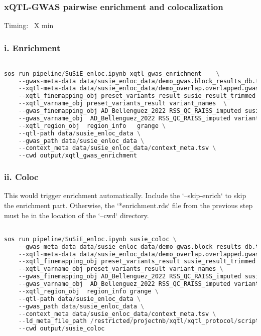 \documentclass[12pt]{article}
\begin{document}
\subsubsection*{xQTL-GWAS pairwise enrichment and colocalization}
Timing: ~X min

\subsubsection*{i. Enrichment}


\noindent
\begin{lstlisting}[language=Python]

sos run pipeline/SuSiE_enloc.ipynb xqtl_gwas_enrichment    \
    --gwas-meta-data data/susie_enloc_data/demo_gwas.block_results_db.tsv \
    --xqtl-meta-data data/susie_enloc_data/demo_overlap.overlapped.gwas.tsv \
    --xqtl_finemapping_obj preset_variants_result susie_result_trimmed  \
    --xqtl_varname_obj preset_variants_result variant_names  \
    --gwas_finemapping_obj AD_Bellenguez_2022 RSS_QC_RAISS_imputed susie_result_trimmed \
    --gwas_varname_obj  AD_Bellenguez_2022 RSS_QC_RAISS_imputed variant_names \
    --xqtl_region_obj  region_info   grange \
    --qtl-path data/susie_enloc_data \
    --gwas_path data/susie_enloc_data \
    --context_meta data/susie_enloc_data/context_meta.tsv \
    --cwd output/xqtl_gwas_enrichment

\end{lstlisting}




\subsubsection*{ii. Coloc}
This would trigger enrichment automatically. Include the `--skip-enrich` to skip the enrichment part. Otherwise, the `*enrichment.rds` file from the previous step must be in the location of the `--cwd` directory.


\noindent
\begin{lstlisting}[language=Python]

sos run pipeline/SuSiE_enloc.ipynb susie_coloc \
    --gwas-meta-data data/susie_enloc_data/demo_gwas.block_results_db.tsv \
    --xqtl-meta-data data/susie_enloc_data/demo_overlap.overlapped.gwas.tsv \
    --xqtl_finemapping_obj preset_variants_result susie_result_trimmed \
    --xqtl_varname_obj preset_variants_result variant_names \
    --gwas_finemapping_obj AD_Bellenguez_2022 RSS_QC_RAISS_imputed susie_result_trimmed \
    --gwas_varname_obj  AD_Bellenguez_2022 RSS_QC_RAISS_imputed variant_names \
    --xqtl_region_obj  region_info grange \
    --qtl-path data/susie_enloc_data \
    --gwas_path data/susie_enloc_data \
    --context_meta data/susie_enloc_data/context_meta.tsv \
    --ld_meta_file_path /restricted/projectnb/xqtl/xqtl_protocol/scripts/pixi_scripts/ld_meta_file.tsv \
    --cwd output/susie_coloc

\end{lstlisting}
\end{document}
